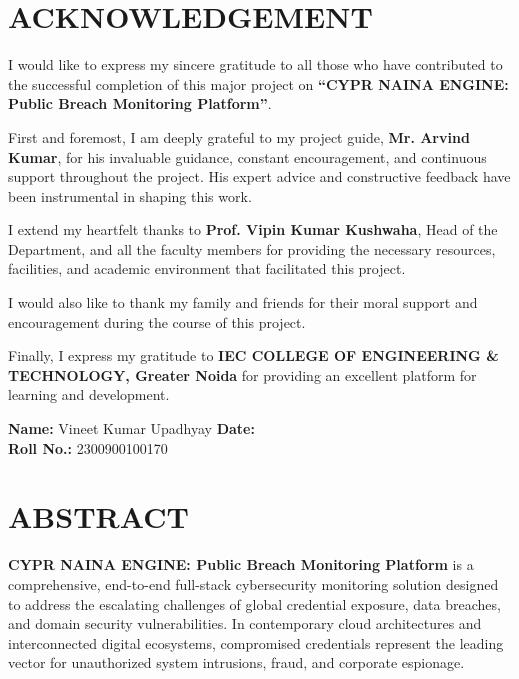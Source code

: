 \documentclass[12pt,a4paper,oneside]{report}
\begin{document}
\chapter*{ACKNOWLEDGEMENT}

I would like to express my sincere gratitude to all those who have contributed to the successful completion of this major project on \textbf{``CYPR NAINA ENGINE: Public Breach Monitoring Platform''}.

First and foremost, I am deeply grateful to my project guide, \textbf{Mr. Arvind Kumar}, for his invaluable guidance, constant encouragement, and continuous support throughout the project. His expert advice and constructive feedback have been instrumental in shaping this work.

I extend my heartfelt thanks to \textbf{Prof. Vipin Kumar Kushwaha}, Head of the Department, and all the faculty members for providing the necessary resources, facilities, and academic environment that facilitated this project.

I would also like to thank my family and friends for their moral support and encouragement during the course of this project.

Finally, I express my gratitude to \textbf{IEC COLLEGE OF ENGINEERING \& TECHNOLOGY, Greater Noida} for providing an excellent platform for learning and development.

\vspace{2.5cm}

\noindent
\textbf{Name:} Vineet Kumar Upadhyay \hfill \textbf{Date:} \underline{\hspace{3cm}}\\
\textbf{Roll No.:} 2300900100170 

\clearpage

\chapter*{ABSTRACT}

\noindent \textbf{CYPR NAINA ENGINE: Public Breach Monitoring Platform} is a comprehensive, end-to-end full-stack cybersecurity monitoring solution designed to address the escalating challenges of global credential exposure, data breaches, and domain security vulnerabilities. In contemporary cloud architectures and interconnected digital ecosystems, compromised credentials represent the leading vector for unauthorized system intrusions, fraud, and corporate espionage.
\end{document}
